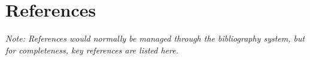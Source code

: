 \section{References}

\textit{Note: References would normally be managed through the bibliography system, but for completeness, key references are listed here.}